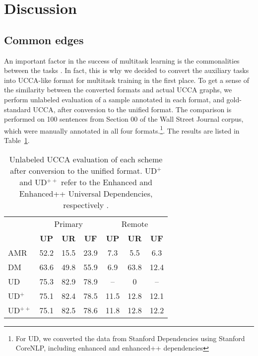 \documentclass[11pt,a4paper]{article}
\begin{document}
\section{Discussion}\label{sec:discussion}

\subsection{Common edges}\label{sec:common}

An important factor in the success of multitask learning is the commonalities between the tasks
\cite{E17-2026,E17-1005}.
In fact, this is why we decided to convert the auxiliary tasks into UCCA-like format for
multitask training in the first place.
To get a sense of the similarity between the converted formats and actual UCCA graphs,
we perform unlabeled evaluation of a sample annotated in each format, and gold-standard UCCA,
after conversion to the unified format.
The comparison is performed on 100 sentences from Section 00 of the Wall Street Journal
corpus, which were manually annotated in all four formats.\footnote{For UD, we converted the
data from Stanford Dependencies using Stanford CoreNLP, including enhanced and enhanced++
dependencies\cite{SCHUSTER16.779}}.
The results are listed in Table~\ref{tab:common}.

\begin{table}
\begin{tabular}{lccc|ccc}
& \multicolumn{3}{c|}{Primary} & \multicolumn{3}{c}{Remote} \\
& \textbf{UP} & \textbf{UR} & \textbf{UF} & \textbf{UP} & \textbf{UR} & \textbf{UF} \\
AMR & 52.2 & 15.5 & 23.9 & 7.3 & 5.5 & 6.3 \\
DM & 63.6 & 49.8 & 55.9 & 6.9 & 63.8 & 12.4 \\
UD & 75.3 & 82.9 & 78.9 & -- & 0 & -- \\
UD$^+$ & 75.1 & 82.4 & 78.5 & 11.5 & 12.8 & 12.1 \\
UD$^{++}$ & 75.1 & 82.5 & 78.6 & 11.8 & 12.8 & 12.2
\end{tabular}
\caption{Unlabeled UCCA evaluation of each scheme after conversion to the unified format.
UD$^+$ and UD$^{++}$ refer to the Enhanced and Enhanced++ Universal Dependencies,
respectively \cite{SCHUSTER16.779}.\label{tab:common}}
\end{table}




\end{document}
